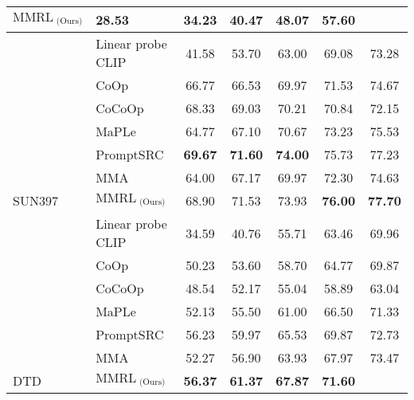 \begin{table*}[t]
{{\begin{tabular}{@{}ll|ccccc}
      \cellcolor[HTML]{E8E8E8}$\text{MMRL}_{\text{ (Ours)}}$ &
      \cellcolor[HTML]{E8E8E8}28.53 &
      \cellcolor[HTML]{E8E8E8}\textbf{34.23} &
      \cellcolor[HTML]{E8E8E8}\textbf{40.47} &
      \cellcolor[HTML]{E8E8E8}\textbf{48.07} &
      \cellcolor[HTML]{E8E8E8}\textbf{57.60} \\ \midrule
     &
      Linear probe CLIP &
      41.58 &
      53.70 &
      63.00 &
      69.08 &
      73.28 \\
     &
      CoOp &
      66.77 &
      66.53 &
      69.97 &
      71.53 &
      74.67 \\
     &
      CoCoOp &
      68.33 &
      69.03 &
      70.21 &
      70.84 &
      72.15 \\
     &
      MaPLe &
      64.77 &
      67.10 &
      70.67 &
      73.23 &
      75.53 \\
     &
      PromptSRC &
      \textbf{69.67} &
      \textbf{71.60} &
      \textbf{74.00} &
      75.73 &
      77.23 \\
     &
      MMA &
      64.00 &
      67.17 &
      69.97 &
      72.30 &
      74.63 \\
    \multirow{-7}{*}{SUN397} &
      \cellcolor[HTML]{E8E8E8}$\text{MMRL}_{\text{ (Ours)}}$ &
      \cellcolor[HTML]{E8E8E8}68.90 &
      \cellcolor[HTML]{E8E8E8}71.53 &
      \cellcolor[HTML]{E8E8E8}73.93 &
      \cellcolor[HTML]{E8E8E8}\textbf{76.00} &
      \cellcolor[HTML]{E8E8E8}\textbf{77.70} \\ \midrule
     &
      Linear probe CLIP &
      34.59 &
      40.76 &
      55.71 &
      63.46 &
      69.96 \\
     &
      CoOp &
      50.23 &
      53.60 &
      58.70 &
      64.77 &
      69.87 \\
     &
      CoCoOp &
      48.54 &
      52.17 &
      55.04 &
      58.89 &
      63.04 \\
     &
      MaPLe &
      52.13 &
      55.50 &
      61.00 &
      66.50 &
      71.33 \\
     &
      PromptSRC &
      56.23 &
      59.97 &
      65.53 &
      69.87 &
      72.73 \\
     &
      MMA &
      52.27 &
      56.90 &
      63.93 &
      67.97 &
      73.47 \\
    \multirow{-7}{*}{DTD} &
      \cellcolor[HTML]{E8E8E8}$\text{MMRL}_{\text{ (Ours)}}$ &
      \cellcolor[HTML]{E8E8E8}\textbf{56.37} &
      \cellcolor[HTML]{E8E8E8}\textbf{61.37} &
      \cellcolor[HTML]{E8E8E8}\textbf{67.87} &
      \cellcolor[HTML]{E8E8E8}\textbf{71.60} &

\end{tabular}}}
\end{table*}
